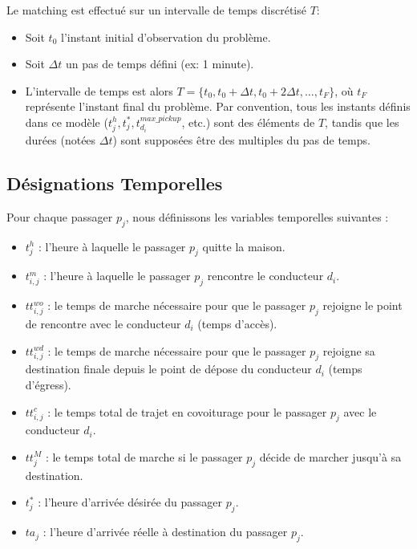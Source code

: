 \documentclass[12pt, a4paper]{article}
\begin{document}
Le matching est effectué sur un intervalle de temps discrétisé $T$:
\begin{itemize}
    \item Soit $t_0$ l'instant initial d'observation du problème.
    \item Soit $\Delta t$ un pas de temps défini (ex: 1 minute).
    \item L'intervalle de temps est alors $T = \{t_0, t_0 + \Delta t, t_0 + 2\Delta t, \ldots, t_F \}$, où $t_F$ représente l'instant final du problème. Par convention, tous les instants définis dans ce modèle ($t_j^h, t_j^*, t_{d_i}^{max\_pickup}$, etc.) sont des éléments de $T$, tandis que les durées (notées $\Delta t$) sont supposées être des multiples du pas de temps.
\end{itemize}

\subsection{Désignations Temporelles}
Pour chaque passager $p_j$, nous définissons les variables temporelles suivantes :
\begin{itemize}
    \item $t^h_j$ : l'heure à laquelle le passager $p_j$ quitte la maison.
    \item $t^m_{i,j}$ : l'heure à laquelle le passager $p_j$ rencontre le conducteur $d_i$.
    \item $tt^{wo}_{i,j}$ : le temps de marche nécessaire pour que le passager $p_j$ rejoigne le point de rencontre avec le conducteur $d_i$ (temps d'accès).
    \item $tt^{wd}_{i,j}$ : le temps de marche nécessaire pour que le passager $p_j$ rejoigne sa destination finale depuis le point de dépose du conducteur $d_i$ (temps d'égress).
    \item $tt^c_{i,j}$ : le temps total de trajet en covoiturage pour le passager $p_j$ avec le conducteur $d_i$.
    \item $tt^M_j$ : le temps total de marche si le passager $p_j$ décide de marcher jusqu'à sa destination.
    \item $t^*_j$ : l'heure d'arrivée désirée du passager $p_j$.
    \item $ta_j$ : l'heure d'arrivée réelle à destination du passager $p_j$.
\end{itemize}
\end{document}
